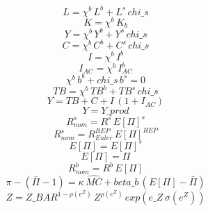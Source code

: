 \begin{dmath}
{L}={\chi^b }\, {L^b}+{L^s}\, {chi\_s}
\end{dmath}
\begin{dmath}
{K}={\chi^b }\, {K_b}
\end{dmath}
\begin{dmath}
{Y}={\chi^b }\, {Y^b}+{Y^s}\, {chi\_s}
\end{dmath}
\begin{dmath}
{C}={\chi^b }\, {C^b}+{C^s}\, {chi\_s}
\end{dmath}
\begin{dmath}
{I}={\chi^b }\, {I^b}
\end{dmath}
\begin{dmath}
{I_{AC}}={\chi^b }\, {I_{AC}^b}
\end{dmath}
\begin{dmath}
{\chi^b }\, {b^b}+{chi\_s}\, {b^s}=0
\end{dmath}
\begin{dmath}
{TB}={\chi^b }\, {TB^b}+{TB^s}\, {chi\_s}
\end{dmath}
\begin{dmath}
{Y}={TB}+{C}+{I}\, \left(1+{I_{AC}}\right)
\end{dmath}
\begin{dmath}
{Y}={Y\_prod}
\end{dmath}
\begin{dmath}
{ R^s_{nom}}={R^s}\, { E[\Pi]^{s} }
\end{dmath}
\begin{dmath}
{ R^s_{nom}}={ R^{REP}_{Euler} }\, { E[\Pi]^{REP} }
\end{dmath}
\begin{dmath}
{ E[\Pi] }={ E[\Pi]^{s} }
\end{dmath}
\begin{dmath}
{ E[\Pi] }={ \Pi }
\end{dmath}
\begin{dmath}
{ R^b_{nom}}={R^b}\, { E[\Pi] }
\end{dmath}
\begin{dmath}
{ \pi }-\left({ \bar{\Pi} }-1\right)={\kappa}\, { \hat{MC} }+{beta\_b}\, \left({ E[\Pi] }-{ \bar{\Pi} }\right)
\end{dmath}
\begin{dmath}
{Z}={Z\_BAR}^{1-{ \rho(e^Z) }}\, {Z}^{{ \rho(e^Z) }}\, exp\left({e\_Z}\, { \sigma(e^Z) }\right)
\end{dmath}

